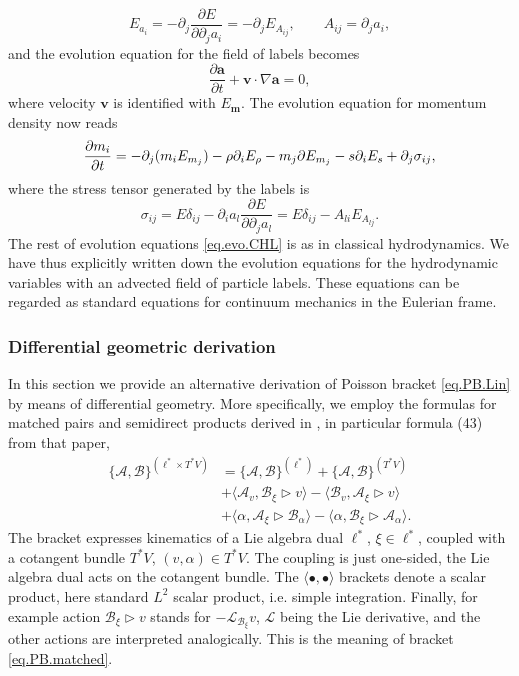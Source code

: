 \documentclass[twoside]{article}
\newcommand{\vv}{{\boldsymbol{v}}}
\newcommand{\aaa}{{\boldsymbol{a}}}
\newcommand{\mm}{{\boldsymbol{m}}}
\newcommand{\ted}{E} %
\newcommand{\LAlg}{\ell}
\newcommand{\LDer}{\mathcal{L}}
\newcommand{\AF}{\mathscr{A}}
\newcommand{\BF}{\mathscr{B}}
\newcommand{\pd}{\partial}
\begin{document}
\begin{equation}
E_{a_i} = -\pd_j \frac{\pd E}{\pd \pd_j a_i} = -\pd_j E_{A_{ij}}, 
\qquad A_{ij} 
= \pd_j a_i,
\end{equation}
and the evolution equation for the field of labels becomes 
\begin{equation}
\frac{\pd \aaa}{\pd t} + \vv \cdot \nabla \aaa =0,
\end{equation}
where velocity $\vv$ is identified with $\ted_{\mm}$. The evolution 
equation for momentum density now reads 
\begin{equation}
\frac{\pd m_i}{\pd t} = 
-\pd_j(m_i \ted_{m_j}) - \rho\pd_i \ted_\rho -m_j 
\pd \ted_{m_j} - s\pd_i \ted_s +\pd_j \sigma_{ij},\\[1mm]
\end{equation}
where the stress tensor 
generated by the labels is
\begin{equation}
\sigma_{ij} = E \delta_{ij} -\pd_i a_l \frac{\pd E}{\pd 
\pd_j a_l} = E \delta_{ij} -A_{li} \ted_{A_{lj}}.
\end{equation}
The rest of 
evolution equations 
\eqref{eq.evo.CHL} is as in classical hydrodynamics. We have thus explicitly written down the evolution equations for the hydrodynamic variables with an advected field of particle labels. These equations can be regarded as standard equations for continuum mechanics in the Eulerian frame.

\subsubsection{Differential geometric derivation}\label{sec.labels.geo}
In this section we provide an alternative derivation of Poisson bracket 
\eqref{eq.PB.Lin} by means of differential geometry.
More specifically, we employ the formulas for matched pairs and semidirect 
products derived in \cite{elmag}, in particular formula (43) from that paper, 
\begin{align}\label{eq.PB.matched}
\{\AF,\BF\}^{(\LAlg^* \times T^*V)} &= \{\AF,\BF\}^{(\LAlg^*)} + 
\{\AF,\BF\}^{(T^*V)}\nonumber\\
&+\langle \AF_v, \BF_\xi \rhd v\rangle-\langle \BF_v, \AF_\xi \rhd 
v\rangle\nonumber\\
&+\langle \alpha, \AF_\xi \rhd \BF_\alpha \rangle-\langle \alpha, \BF_\xi \rhd 
\AF_\alpha \rangle.
\end{align}
The bracket expresses kinematics of a Lie algebra dual $\LAlg^*$, $\xi\in 
\LAlg^*$, coupled with a cotangent bundle $T^*V$, $(v, \alpha)\in T^*V$. The 
coupling is just one-sided, the Lie algebra dual acts on the cotangent bundle. 
The $\langle\bullet,\bullet\rangle$ brackets denote a scalar product, here 
standard $L^2$ scalar product, i.e. simple integration. Finally, for example 
action $\BF_\xi \rhd v$ stands for $-\LDer_{\BF_\xi} v$, $\LDer$ being the Lie 
derivative, and the other actions are interpreted analogically. 
This is the meaning of bracket \eqref{eq.PB.matched}.
\end{document}
